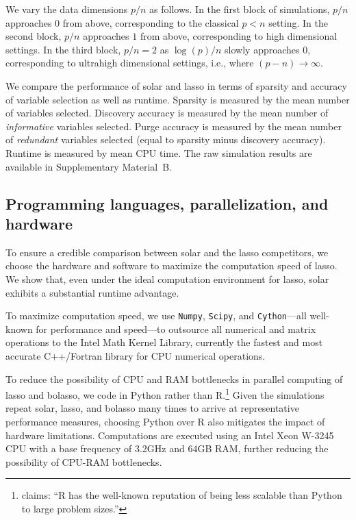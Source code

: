 \documentclass[11pt,review,authoryear]{elsarticle}
\begin{document}
We vary the data dimensions $p/n$ as follows. In the first block of simulations, $p/n$ approaches $0$ from above, corresponding to the classical $p<n$ setting. In the second block, $p/n$ approaches $1$ from above, corresponding to high dimensional settings. In the third block, $p/n=2$ as $\log(p)/n$ slowly approaches $0$, corresponding to ultrahigh dimensional settings, i.e., where $(p-n)\rightarrow\infty$.

We compare the performance of solar and lasso in terms of sparsity and accuracy of variable selection as well as runtime. Sparsity is measured by the mean number of variables selected. Discovery accuracy is measured by the mean number of \emph{informative} variables selected. Purge accuracy is measured by the mean number of \emph{redundant} variables selected (equal to sparsity minus discovery accuracy). Runtime is measured by mean CPU time.  The raw simulation results are available in Supplementary Material~B.

\subsection{Programming languages, parallelization, and hardware}

To ensure a credible comparison between solar and the lasso competitors, we choose the hardware and software to maximize the computation speed of lasso. We show that, even under the ideal computation environment for lasso, solar exhibits a substantial runtime advantage.

To maximize computation speed, we use \texttt{Numpy}, \texttt{Scipy}, and \texttt{Cython}---all well-known for performance and speed---to outsource all numerical and matrix operations to the Intel Math Kernel Library, currently the fastest and most accurate C++/Fortran library for CPU numerical operations.

To reduce the possibility of CPU and RAM bottlenecks in parallel computing of lasso and bolasso, we code in Python rather than \textsf{R}.\footnote{\citet{donoho201750} claims: ``\textsf{R} has the well-known reputation of being less scalable than Python to large problem sizes.''} Given the simulations repeat solar, lasso, and bolasso many times to arrive at representative performance measures, choosing Python over \textsf{R} also mitigates the impact of hardware limitations. Computations are executed using an Intel Xeon W-3245 CPU with a base frequency of 3.2GHz and 64GB RAM, further reducing the possibility of CPU-RAM bottlenecks.
\end{document}
